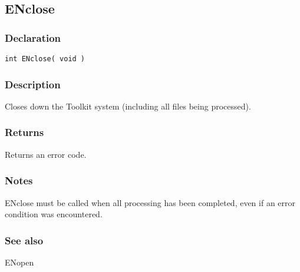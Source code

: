 \subsection{ENclose}
\subsubsection{Declaration}
\begin{lstlisting}
int ENclose( void )
\end{lstlisting}

\subsubsection{Description}
Closes down the Toolkit system (including all files being processed).
  
\subsubsection{Returns}
Returns an error code.
 


\subsubsection{Notes}
ENclose must be called when all processing has been completed, even if an error condition was encountered.  

\subsubsection{See also}
ENopen
